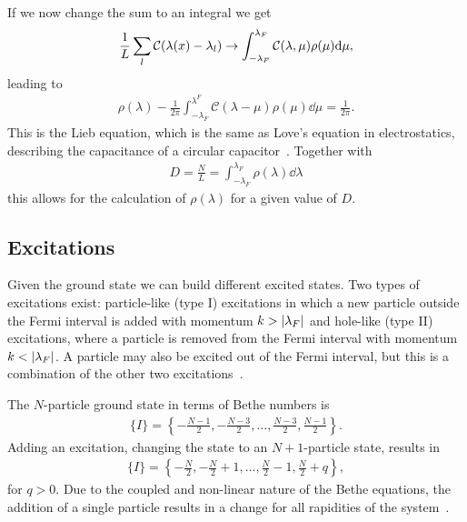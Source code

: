 \documentclass[11pt, a4paper]{report} %
\begin{document}
If we now change the sum to an integral we get 
\begin{align}
  \frac{1}{L} \sum_l \mathcal{C}\qty(\lambda(x)- \lambda_l) \to \int_{-\lambda_F}^{\lambda_F} \mathcal{C}(\lambda,\mu) \rho(\mu) \dd \mu, 
\end{align}
leading to~\cite{Korepin1993}
\begin{align}
  \rho(\lambda) - \frac{1}{2\pi} \int_{-\lambda_F}^{\lambda^F} \mathcal{C}(\lambda-\mu) \rho(\mu) \dd \mu = \frac{1}{2\pi}.
\end{align}
This is the Lieb equation, which is the same as Love's equation in electrostatics, describing the capacitance of a circular capacitor~\cite{Gaudin2009}.
Together with 
\begin{align}
  D = \frac{N}{L} = \int_{-\lambda_F}^{\lambda_F} \rho(\lambda) \dd \lambda
\end{align}
this allows for the calculation of \(\rho(\lambda)\) for a given value of \(D\).


\subsection{Excitations}

Given the ground state we can build different excited states.
Two types of excitations exist: particle-like (type I) excitations in which a new particle outside the Fermi interval is added with momentum \(k > \abs{\lambda_F}\) and hole-like (type II) excitations, where a particle is removed from the Fermi interval with momentum \(k < \abs{\lambda_F}\).
A particle may also be excited out of the Fermi interval, but this is a combination of the other two excitations~\cite{Franchini2017}.

The \(N\)-particle ground state in terms of Bethe numbers is
\begin{align}
  \label{eq:22}
  \{I\} = \left\{-\frac{N-1}{2},-\frac{N-3}{2}, \ldots, \frac{N-3}{2},\frac{N-1}{2}\right\}.
\end{align}
Adding an excitation, changing the state to an \(N+1\)-particle state, results in
\begin{align}
  \label{eq:23}
    \{I\} = \left\{-\frac{N}{2},-\frac{N}{2}+1, \ldots, \frac{N}{2}-1,\frac{N}{2}+q\right\},
\end{align}
for \(q>0\).
Due to the coupled and non-linear nature of the Bethe equations, the addition of a single particle results in a change for all rapidities of the system~\cite{Franchini2017}.
\end{document}
